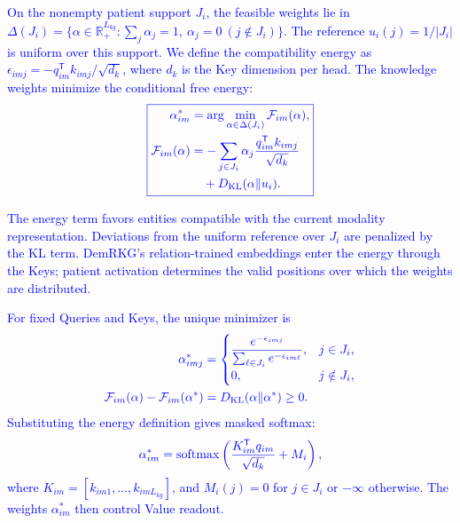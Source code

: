\documentclass[lettersize,journal]{IEEEtran}
\begin{document}
    \textcolor{blue}{On the nonempty patient support $J_i$, the feasible weights lie in $\Delta(J_i)=\{\alpha\in\mathbb R_+^{L_{kg}}:\sum_j\alpha_j=1,\ \alpha_j=0\ (j\notin J_i)\}$. The reference $u_i(j)=1/|J_i|$ is uniform over this support. We define the compatibility energy as $\epsilon_{imj}=-q_{im}^{\mathsf T}k_{imj}/\sqrt{d_k}$, where $d_k$ is the Key dimension per head. The knowledge weights minimize the conditional free energy:}
    \begin{equation}
        {\color{blue}
        \boxed{
        \begin{aligned}
        \alpha_{im}^{*}&=\arg\min_{\alpha\in\Delta(J_i)}\mathcal F_{im}(\alpha),\\
        \mathcal F_{im}(\alpha)&=-\sum_{j\in J_i}\alpha_j
        \frac{q_{im}^{\mathsf T}k_{imj}}{\sqrt{d_k}}\\
        &\quad+D_{\mathrm{KL}}(\alpha\Vert u_i).
        \end{aligned}
        }
        }
        \label{eq:energy_min}
    \end{equation}

    \textcolor{blue}{The energy term favors entities compatible with the current modality representation. Deviations from the uniform reference over $J_i$ are penalized by the KL term. DemRKG's relation-trained embeddings enter the energy through the Keys; patient activation determines the valid positions over which the weights are distributed.}

    \textcolor{blue}{For fixed Queries and Keys, the unique minimizer is}
    \begin{equation}
        {\color{blue}
        \begin{aligned}
        \alpha_{imj}^{*}&=
        \begin{cases}
        \displaystyle\frac{e^{-\epsilon_{imj}}}
        {\sum_{\ell\in J_i}e^{-\epsilon_{im\ell}}},&j\in J_i,\\[6pt]
        0,&j\notin J_i,
        \end{cases}\\
        \mathcal F_{im}(\alpha)-\mathcal F_{im}(\alpha^*)
        &=D_{\mathrm{KL}}(\alpha\Vert\alpha^*)\geq0.
        \end{aligned}
        }
        \label{eq:knowledge_optimum}
    \end{equation}
    \textcolor{blue}{Substituting the energy definition gives masked softmax:}
    \begin{equation}
        {\color{blue}
        \alpha_{im}^*=\operatorname{softmax}
        \left(\frac{K_{im}^{\mathsf T}q_{im}}{\sqrt{d_k}}+M_i\right),
        }
        \label{eq:knowledge_weights}
    \end{equation}
    \textcolor{blue}{where $K_{im}=[k_{im1},\ldots,k_{imL_{kg}}]$, and $M_i(j)=0$ for $j\in J_i$ or $-\infty$ otherwise. The weights $\alpha_{im}^*$ then control Value readout.}
\end{document}
